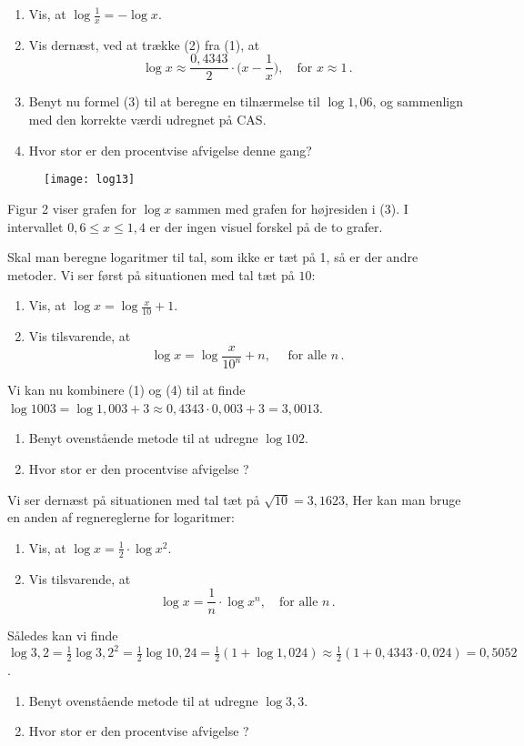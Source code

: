 \documentclass[12pt,oneside,a4paper]{article}
\theoremstyle{plain}
\begin{document}
\begin{enumerate}[label=(\alph*), resume]
    \item Vis, at $\log\frac1x = -\log x$.
    \item Vis dernæst, ved at trække (2) fra (1), at 
        \[
            \tag{3}
            \log x \approx \frac{0,4343}{2} \cdot \Big(x-\frac1x\Big),\quad
            \mbox{for $x\approx 1$}\,.
            \]
    \item Benyt nu formel (3) til at beregne en tilnærmelse til $\log
        1,06$, og sammenlign med den korrekte værdi udregnet på CAS.
    \item Hvor stor er den procentvise afvigelse denne gang?
\end{enumerate}

\begin{figure}[H]
    \centering
    \texttt{[image: log13]}
\end{figure}
Figur 2 viser grafen for $\log x$ sammen med grafen for højresiden i (3).  I
intervallet $0,6\le x \le 1,4$ er der ingen visuel forskel på de to grafer.

Skal man beregne logaritmer til tal, som ikke er tæt på 1, så er der andre metoder.
Vi ser først på situationen med tal tæt på $10$:

\begin{enumerate}[label=(\alph*), resume]
    \item Vis, at $\log x = \log\frac{x}{10} + 1$.
    \item Vis tilsvarende, at 
        \[
            \tag{4}
            \log x = \log\frac{x}{10^n} + n,\quad\mbox{ for alle $n$}\,.
        \]

\end{enumerate}
Vi kan nu kombinere (1) og (4) til at finde $\log 1003 = \log 1,003 + 3
\approx 0,4343\cdot 0,003 + 3 = 3,0013$.
\begin{enumerate}[label=(\alph*), resume]
    \item Benyt ovenstående metode til at udregne $\log 102$.
    \item Hvor stor er den procentvise afvigelse ?
\end{enumerate}

Vi ser dernæst på situationen med tal tæt på $\sqrt{10} = 3,1623$, Her kan man
bruge en anden af regnereglerne for logaritmer:
\begin{enumerate}[label=(\alph*), resume]
    \item Vis, at $\log x = \frac12 \cdot \log x^2$.
    \item Vis tilsvarende, at
        \[
            \tag{5}
            \log x = \frac1n \cdot \log x^n,\quad \mbox{for alle $n$}\,.
        \]
\end{enumerate}
Således kan vi finde $\log 3,2 = \frac12 \log 3,2^2 = \frac12 \log 10,24
 = \frac12 (1 + \log 1,024) \approx \frac12 (1 + 0,4343\cdot 0,024)
 = 0,5052$.
\begin{enumerate}[label=(\alph*), resume]
    \item Benyt ovenstående metode til at udregne $\log 3,3$.
    \item Hvor stor er den procentvise afvigelse ?
\end{enumerate}
\end{document}

